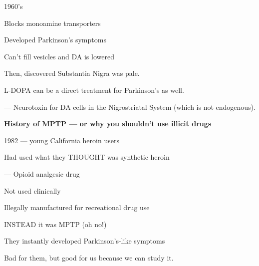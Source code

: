 \begin{coloredlist}
\begin{coloredlist}
\begin{coloredlist}
            \begin{coloredlist}
                \item 1960's
                \begin{coloredlist}
                    \item Blocks monoamine transporters
                    \begin{coloredlist}
                        \item Developed Parkinson's symptoms
                        \item Can't fill vesicles and DA is lowered
                    \end{coloredlist}
                \end{coloredlist}
                \item Then, discovered Substantia Nigra was pale.
            \end{coloredlist}
            \item L-DOPA can be a direct treatment for Parkinson's as well.
            \item {} — Neurotoxin for DA cells in the Nigrostriatal System (which is not endogenous).
            \item \textbf{History of MPTP — or why you shouldn't use illicit drugs}
            \begin{coloredlist}
                \item 1982 — young California heroin users
                \item Had used what they THOUGHT was synthetic heroin
                \begin{coloredlist}
                    \item {} — Opioid analgesic drug
                    \begin{coloredlist}
                        \item Not used clinically
                        \item Illegally manufactured for recreational drug use
                    \end{coloredlist}
                    \item INSTEAD it was MPTP (oh no!)
                    \begin{coloredlist}
                        \item They instantly developed Parkinson's-like symptoms
                        \item Bad for them, but good for us because we can study it.
                        \begin{coloredlist}

\end{coloredlist}
\end{coloredlist}
\end{coloredlist}
\end{coloredlist}
\end{coloredlist}
\end{coloredlist}
\end{coloredlist}
